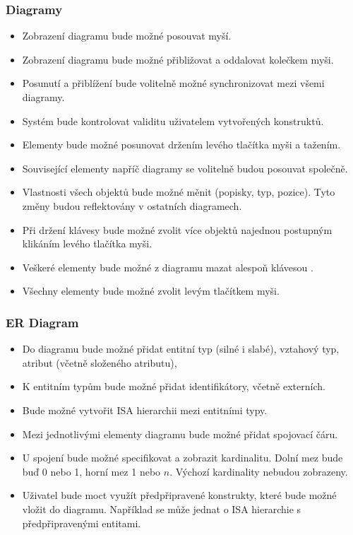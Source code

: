 \subsubsection*{Diagramy}
\begin{itemize}
  \item Zobrazení diagramu bude možné posouvat myší.
  \item Zobrazení diagramu bude možné přibližovat a oddalovat kolečkem myši.
  \item Posunutí a přiblížení bude volitelně možné synchronizovat mezi všemi diagramy.
  \item Systém bude kontrolovat validitu uživatelem vytvořených konstruktů.
  \item Elementy bude možné posunovat držením levého tlačítka myši a tažením.
  \item Související elementy napříč diagramy se volitelně budou posouvat společně.
  \item Vlastnosti všech objektů bude možné měnit (popisky, typ, pozice).
        Tyto změny budou reflektovány v ostatních diagramech.
  \item Při držení klávesy \keys{\ctrl} bude možné zvolit více objektů najednou postupným klikáním levého tlačítka myši.
  \item Veškeré elementy bude možné z diagramu mazat alespoň klávesou .
  \item Všechny elementy bude možné zvolit levým tlačítkem myši.
\end{itemize}

\subsubsection*{ER Diagram}
\begin{itemize}
  \item Do diagramu bude možné přidat entitní typ (silné i slabé), vztahový typ, atribut (včetně složeného atributu),
  \item K entitním typům bude možné přidat identifikátory, včetně externích.
  \item Bude možné vytvořit ISA hierarchii mezi entitními typy.
  \item Mezi jednotlivými elementy diagramu bude možné přidat spojovací čáru.
  \item U spojení bude možné specifikovat a zobrazit kardinalitu.
        Dolní mez bude buď 0 nebo 1, horní mez 1 nebo $n$.
        Výchozí kardinality \oneone{} nebudou zobrazeny.
  \item Uživatel bude moct využít předpřipravené konstrukty, které bude možné vložit do diagramu.
        Například se může jednat o ISA hierarchie s předpřipravenými entitami.
\end{itemize}

